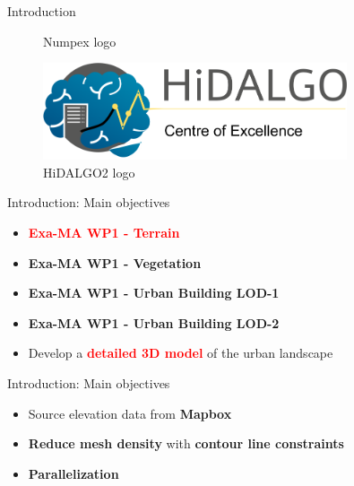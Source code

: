 \documentclass[10pt]{beamer}
\begin{document}
\begin{frame}{Introduction}
\begin{figure}
\begin{minipage}{0.3\textwidth}
        \caption{Numpex logo \cite{numpex}}
    \end{minipage}
    \begin{minipage}{0.3\textwidth}
      \centering
      \includegraphics[width=0.8\textwidth]{images/logo-hidalgo2.png}
      \caption{HiDALGO2 logo \cite{hidalgo2}}
    \end{minipage}
  \end{figure}
\end{frame}

\begin{frame}{Introduction: Main objectives}
  \begin{itemize}
    \Large
    \item \textbf{\textcolor{red}{Exa-MA WP1 - Terrain}}
    \vspace{1em}
    \item \textbf{Exa-MA WP1 - Vegetation}
    \item \textbf{Exa-MA WP1 - Urban Building LOD-1}
    \item \textbf{Exa-MA WP1 - Urban Building LOD-2}
    \vspace{2em}
    \item Develop a \textbf{\textcolor{red}{detailed 3D model}} of the urban landscape
  \end{itemize}
\end{frame}

\begin{frame}{Introduction: Main objectives}
  \Large
  \begin{itemize}
    \item Source elevation data from \textbf{Mapbox}
    \item \textbf{Reduce mesh density} with \textbf{contour line constraints}
    \item \textbf{Parallelization}
  \end{itemize}
\end{frame}
\end{document}
